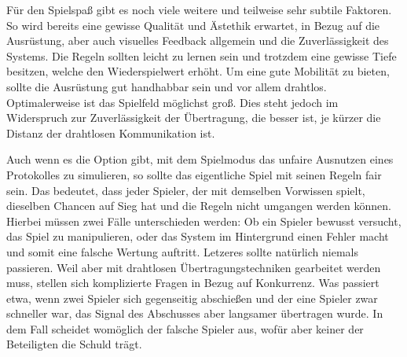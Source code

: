 Für den Spielspaß gibt es noch viele weitere und teilweise sehr subtile
Faktoren. So wird bereits eine gewisse Qualität und Ästethik erwartet, in
Bezug auf die Ausrüstung, aber auch visuelles Feedback allgemein und die
Zuverlässigkeit des Systems. Die Regeln sollten leicht zu lernen sein und
trotzdem eine gewisse Tiefe besitzen, welche den Wiederspielwert erhöht.
Um eine gute Mobilität zu bieten, sollte die Ausrüstung gut handhabbar sein
und vor allem drahtlos. Optimalerweise ist das Spielfeld möglichst groß. Dies
steht jedoch im Widerspruch zur Zuverlässigkeit der Übertragung, die besser ist,
je kürzer die Distanz der drahtlosen Kommunikation ist.

Auch wenn es die Option gibt, mit dem Spielmodus das unfaire Ausnutzen eines
Protokolles zu simulieren, so sollte das eigentliche Spiel mit seinen Regeln
fair sein. Das bedeutet, dass jeder Spieler, der mit demselben Vorwissen spielt,
dieselben Chancen auf Sieg hat und die Regeln nicht umgangen werden können.
Hierbei müssen zwei Fälle unterschieden werden: Ob ein Spieler bewusst versucht,
das Spiel zu manipulieren, oder das System im Hintergrund einen Fehler macht
und somit eine falsche Wertung auftritt. Letzeres sollte natürlich niemals
passieren. Weil aber mit drahtlosen Übertragungstechniken gearbeitet werden
muss, stellen sich komplizierte Fragen in Bezug auf Konkurrenz. Was passiert
etwa, wenn zwei Spieler sich gegenseitig abschießen und der eine Spieler
zwar schneller war, das Signal des Abschusses aber langsamer übertragen wurde.
In dem Fall scheidet womöglich der falsche Spieler aus, wofür aber keiner der
Beteiligten die Schuld trägt.
